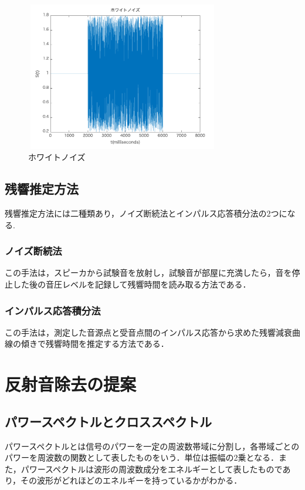 \documentclass[a4j,11pt]{jsarticle}
\begin{document}
\begin{figure}[h]
\begin{center}
 \includegraphics[clip,width=85mm,height=65mm]{whitenoize.pdf}
\end{center}
 \caption{ホワイトノイズ}
 \label{fig:whitenoize}
\end{figure}

\subsection{残響推定方法}
残響推定方法には二種類あり，ノイズ断続法とインパルス応答積分法の2つになる.

\subsubsection{ノイズ断続法}
この手法は，スピーカから試験音を放射し，試験音が部屋に充満したら，音を停止した後の音圧レベルを記録して残響時間を読み取る方法である．
\subsubsection{インパルス応答積分法}
この手法は，測定した音源点と受音点間のインパルス応答から求めた残響減衰曲線の傾きで残響時間を推定する方法である．
\newpage
\section{反射音除去の提案}
\subsection{パワースペクトルとクロススペクトル}
パワースペクトルとは信号のパワーを一定の周波数帯域に分割し，各帯域ごとのパワーを周波数の関数として表したものをいう．単位は振幅の2乗となる．また，パワースペクトルは波形の周波数成分をエネルギーとして表したものであり，その波形がどれほどのエネルギーを持っているかがわかる．\cite{oka6}
\end{document}
